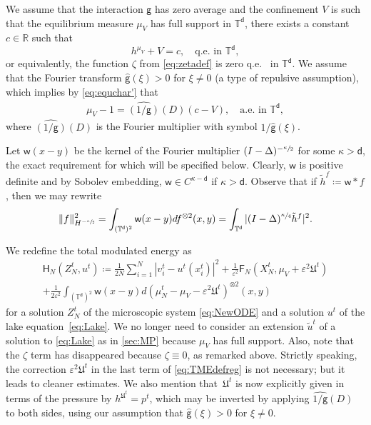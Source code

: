 \documentclass[10pt]{amsart}
\theoremstyle{plain}
\theoremstyle{definition}
\newcommand{\R}{{\mathbb{R}}}
\newcommand{\T}{{\mathbb{T}}}
\let\vep\varepsilon
\let\ka\kappa
\let\tl\tilde
\let\ux X
\newcommand{\ZN}{Z_N}
\newcommand{\Uu}{\mathfrak{U}}
\newcommand{\Fr}{\mathsf{F}}
\newcommand{\Hr}{\mathsf{H}}
\renewcommand{\d}{\mathsf{d}}
\newcommand{\g}{{\mathsf{g}}}
\newcommand{\w}{\mathsf{w}}
\begin{document}
We assume that the interaction $\g$ has zero average and the confinement $V$ is such that the equilibrium measure $\mu_V$ has full support in $\T^\d$, \ie there exists a constant $c\in\R$ such that%
\begin{equation}\label{eq:equchar'}
h^{\mu_V} + V = c, \quad \text{q.e.} \text{ in } \T^\d,
\end{equation}
or equivalently, the function $\zeta$ from \eqref{eq:zetadef} is zero q.e.%
~in $\T^\d$. We assume that the Fourier transform $\hat{\g}(\xi)>0$ for $\xi\ne 0$ (a type of repulsive assumption), which implies by \eqref{eq:equchar'} that
\begin{align*}
\mu_V -1 = {\widehat{(1/\g)}(D)}(c-V), \quad \text{a.e.} \text{ in } \T^\d,
\end{align*}
where {$\widehat{(1/\g)}(D)$} is the Fourier multiplier with symbol {$1/\hat{\g}(\xi)$}.

Let $\w(x-y)$ be the kernel of the Fourier multiplier $(I-\Delta)^ {-\sfrac{\ka}{2}}$ for some {$\ka > \d$}, {the exact requirement for which will be specified below}. Clearly, $\w$ is positive definite and by Sobolev embedding, $\w\in C^{{\ka-\d}}$ if {$\ka>\d$}. Observe that if $\tl{h}^f \coloneqq \w\ast f$, then we may rewrite
\begin{equation}\label{eq:welec}
\|f\|_{H^{-\sfrac{\ka}{2}}}^2 = \int_{(\T^\d)^2}\w(x-y)df^{\otimes 2}(x,y) = \int_{\T^\d} |(I-\Delta)^{\sfrac{\ka}{4}}\tl{h}^{f}|^2.
\end{equation}

We {redefine} the total modulated energy as
\begin{multline}\label{eq:TMEdefreg}
\Hr_N(\ZN^t,u^t) \coloneqq \frac{1}{2N}\sum_{i=1}^N |v_i^t-u^t(x_i^t)|^2 + \frac{1}{\vep^2}\Fr_N(\ux_N^t,\mu_V+\vep^2\Uu^t) \\
+\frac{1}{2\vep^2}\int_{(\T^\d)^2}\w(x-y)d(\mu_N^t-\mu_V-\vep^2\Uu^t)^{\otimes 2}(x,y)
\end{multline}
for a solution $\ZN^t$ of the microscopic system \eqref{eq:NewODE} and a solution $u^t$ of the lake equation~\eqref{eq:Lake}. We no longer need to consider an extension $\tl{u}^t$ of a solution to \eqref{eq:Lake} as in \cref{sec:MP} because $\mu_V$ has full support. Also, note that the $\zeta$ term has disappeared because $\zeta\equiv 0$, as remarked above. Strictly speaking, the correction $\vep^2\Uu^t$ in the last term of \eqref{eq:TMEdefreg} is not necessary; but it leads to cleaner estimates. We also mention that~$\Uu^t$ is now explicitly given in terms of the pressure by $h^{\Uu^t} = p^t$, which may be inverted by applying {$\widehat{1/\g}(D)$} to both sides, using our assumption that $\hat{\g}(\xi)>0$ for $\xi\ne 0$.
\end{document}
